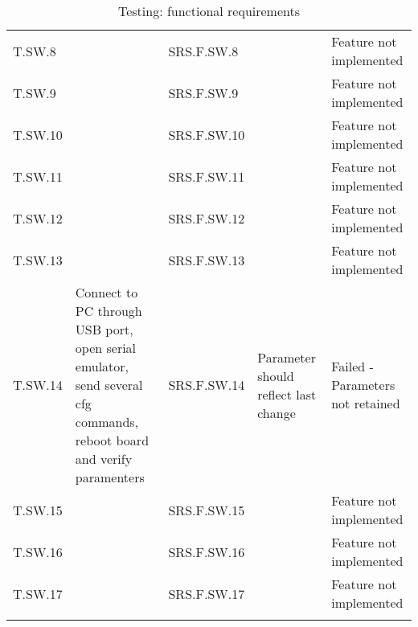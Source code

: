 \begin{table}[H]
\begin{tabular}{@{} >{\footnotesize}l >{\footnotesize}m{16em} >{\footnotesize}l  >{\footnotesize}m{12em}  >{\footnotesize}m{6em} @{}}
    T.SW.8  &  & SRS.F.SW.8       &   & Feature not implemented \\ \addlinespace
    T.SW.9  &  & SRS.F.SW.9        &   & Feature not implemented \\ \addlinespace
    T.SW.10 &  & SRS.F.SW.10       &   & Feature not implemented \\ \addlinespace
    T.SW.11 &  & SRS.F.SW.11       &   & Feature not implemented \\ \addlinespace
    T.SW.12 &  & SRS.F.SW.12       &   & Feature not implemented \\ \addlinespace
    T.SW.13 &  & SRS.F.SW.13       &   & Feature not implemented \\ \addlinespace
    T.SW.14 & Connect to PC through USB port, open serial emulator, send several cfg commands, reboot board and verify paramenters  & SRS.F.SW.14       & Parameter should reflect last change  & Failed - Parameters not retained \\ \addlinespace
    T.SW.15 &  & SRS.F.SW.15   &  & Feature not implemented \\ \addlinespace
    T.SW.16 &  & SRS.F.SW.16   &  & Feature not implemented \\ \addlinespace
    T.SW.17 &  & SRS.F.SW.17   &  & Feature not implemented \\ \addlinespace
    \bottomrule
\end{tabular}
\caption{Testing: functional requirements}\label{tab:test_f}
\end{table}
